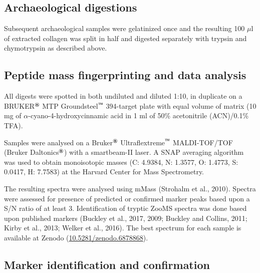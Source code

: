 \documentclass[preprint, 3p, authoryear]{elsarticle} %
\begin{document}
\hypertarget{archaeological-digestions}{%
\subsection{Archaeological digestions}\label{archaeological-digestions}}

Subsequent archaeological samples were gelatinized once and the resulting 100 \(\mu\)l of extracted collagen was split in half and digested separately with trypsin and chymotrypsin as described above.

\hypertarget{peptide-mass-fingerprinting-and-data-analysis}{%
\subsection{Peptide mass fingerprinting and data analysis}\label{peptide-mass-fingerprinting-and-data-analysis}}

All digests were spotted in both undiluted and diluted 1:10, in duplicate on a BRUKER\(^\text{\textregistered}\) MTP Groundsteel\(^\text{\texttrademark}\) 394-target plate with equal volume of matrix (10 mg of \(\alpha\)-cyano-4-hydroxycinnamic acid in 1 ml of 50\% acetonitrile (ACN)/0.1\% TFA).

Samples were analysed on a Bruker\(^\text{\textregistered}\) Ultraflextreme\(^\text{\texttrademark}\) MALDI-TOF/TOF (Bruker Daltonics\(^\text{\textregistered}\)) with a smartbeam-II laser. A SNAP averaging algorithm was used to obtain monoisotopic masses (C: 4.9384, N: 1.3577, O: 1.4773, S: 0.0417, H: 7.7583) at the Harvard Center for Mass Spectrometry.

The resulting spectra were analysed using mMass (Strohalm et al., 2010). Spectra were assessed for presence of predicted or confirmed marker peaks based upon a S/N ratio of at least 3. Identification of tryptic ZooMS spectra was done based upon published markers (Buckley et al., 2017, 2009; Buckley and Collins, 2011; Kirby et al., 2013; Welker et al., 2016). The best spectrum for each sample is available at Zenodo (\href{https://doi.org/doi:10.5281/zenodo.6878868}{10.5281/zenodo.6878868}).

\hypertarget{marker-identification-and-confirmation}{%
\subsection{Marker identification and confirmation}\label{marker-identification-and-confirmation}}
\end{document}
